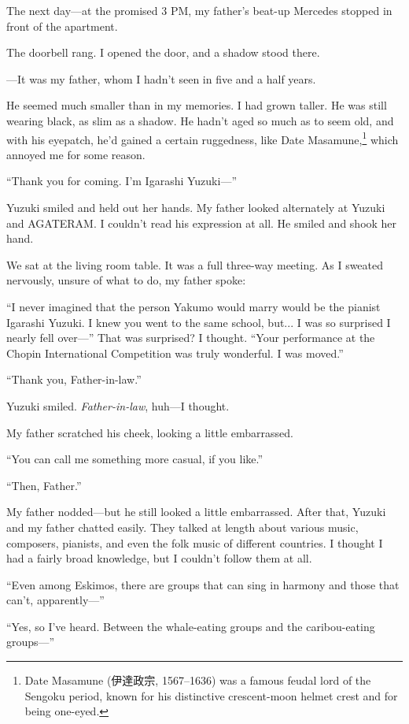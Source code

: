 \documentclass[
    a4paper,
    12pt,
    twoside,
    openany,
    UTF8,
    fontset=windows
]{ctexbook}
\begin{document}
The next day---at the promised 3 PM, my father's beat-up Mercedes stopped in front of the apartment.

The doorbell rang. I opened the door, and a shadow stood there.

---It was my father, whom I hadn't seen in five and a half years.

He seemed much smaller than in my memories. I had grown taller. He was still wearing black, as slim as a shadow. He hadn't aged so much as to seem old, and with his eyepatch, he'd gained a certain ruggedness, like Date Masamune,\footnote{Date Masamune (伊達政宗, 1567–1636) was a famous feudal lord of the Sengoku period, known for his distinctive crescent-moon helmet crest and for being one-eyed.} which annoyed me for some reason.

``Thank you for coming. I'm Igarashi Yuzuki---''

Yuzuki smiled and held out her hands. My father looked alternately at Yuzuki and AGATERAM. I couldn't read his expression at all. He smiled and shook her hand.

We sat at the living room table. It was a full three-way meeting. As I sweated nervously, unsure of what to do, my father spoke:

``I never imagined that the person Yakumo would marry would be the pianist Igarashi Yuzuki. I knew you went to the same school, but... I was so surprised I nearly fell over---'' That was surprised? I thought. ``Your performance at the Chopin International Competition was truly wonderful. I was moved.''

``Thank you, Father-in-law.''

Yuzuki smiled. \emph{Father-in-law}, huh---I thought.

My father scratched his cheek, looking a little embarrassed.

``You can call me something more casual, if you like.''

``Then, Father.''

My father nodded---but he still looked a little embarrassed. After that, Yuzuki and my father chatted easily. They talked at length about various music, composers, pianists, and even the folk music of different countries. I thought I had a fairly broad knowledge, but I couldn't follow them at all.

``Even among Eskimos, there are groups that can sing in harmony and those that can't, apparently---''

``Yes, so I've heard. Between the whale-eating groups and the caribou-eating groups---''
\end{document}
